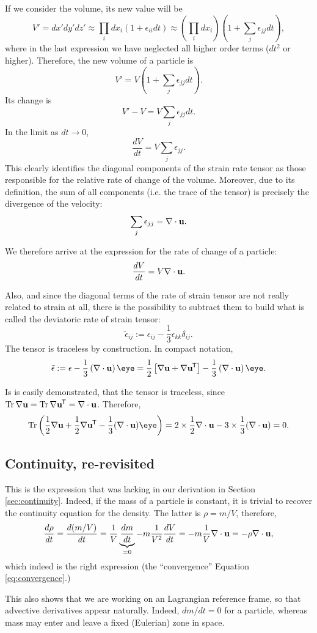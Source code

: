If we consider the volume, its new value will be
\[
V'= dx' dy' dz'  \approx  \prod_i  dx_i \left( 1+\epsilon_{ii} dt \right)
\approx \left(\prod_i  dx_i \right) \left( 1 + \sum_j  \epsilon_{jj} dt \right) ,
\]
where in the last expression we have neglected all higher order terms
($dt^2$ or higher). Therefore, the new volume of a particle is
\[
V' = V \left( 1 + \sum_j  \epsilon_{jj} dt \right) .
\]
Its change is
\[
V'-V =  V \sum_j  \epsilon_{jj} dt .
\]
In the limit as $dt\to 0$,
\[
\frac{d V}{dt} = V \sum_j  \epsilon_{jj} .
\]
This clearly identifies the diagonal components of the strain rate tensor
as those responsible for the relative rate of change of the volume.
Moreover, due to its definition, the sum of all components (i.e. the
trace of the tensor) is precisely the divergence of the velocity:
\[
\sum_j  \epsilon_{jj} = \nabla\cdot \mathbf{u} .
\]

We therefore arrive at the expression for the rate of change of a particle:
\[
\frac{d V}{dt} = V  \nabla\cdot \mathbf{u} .
\]

Also, and since the diagonal terms of the rate of strain tensor are
not really related to strain at all, there is the possibility to subtract them
to build what is called the deviatoric  rate of strain tensor:
\[
\tilde{\epsilon}_{ij} := \epsilon_{ij} - \frac13 \epsilon_{kk} \delta_{ij} .
\]
The tensor is traceless by construction. In compact notation,
\begin{equation}\label{eq:deviatoric_rate_of_strain}
	\tilde{\epsilon} := \epsilon - \frac13 \left( \nabla\cdot \bfu \right)  \eye =
\frac12
\left[
\nabla \bfu +
\nabla \bfu\tran
\right] - \frac13 \left( \nabla\cdot \bfu \right)  \eye .
\end{equation}


Is is easily demonstrated, that the tensor is traceless, since
$\operatorname{Tr}  \nabla\mathbf{u} = \operatorname{Tr} \nabla\mathbf{u}^{\mkern-1.5mu\mathsf{T}} = \nabla\cdot\mathbf{u} $. Therefore,
\[
\Tr \left( \frac12 \nabla\bfu + \frac12 \nabla\bfu\tran -\frac13 (\divu) \eye \right) =
2\times \frac12 \divu - 3\times \frac13 (\divu) = 0 .
\]




\subsection{Continuity, re-revisited}
\label{sec:continuity3}

This is the expression that was lacking in our derivation in
Section \ref{sec:continuity}. Indeed, if the mass of a particle is
constant, it is trivial to recover the continuity equation for the
density. The latter is $\rho=m/V$, therefore,
\[
\frac{d \rho }{dt} =
\frac{d (m/V) }{dt} = \frac1V \underbrace{\frac{ dm }{dt}}_{=0} -
m\frac1{V^2}  \frac{ dV }{dt } =
- m\frac1{V}  \nabla\cdot \mathbf{u}  = -\rho \nabla\cdot \mathbf{u} ,
\]
which indeed is the right expression (the ``convergence'' Equation
\ref{eq:convergence}.)

This also shows that we are working on an Lagrangian reference frame, so
that advective derivatives appear naturally. Indeed, $dm/dt=0$ for a
particle, whereas mass may enter and leave a fixed (Eulerian) zone in
space.

